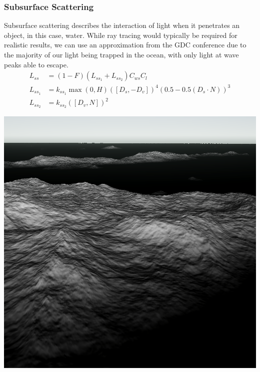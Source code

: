 \subsubsection{Subsurface Scattering}

Subsurface scattering describes the interaction of light when it penetrates an object, in this case, water. While ray tracing would typically be required for realistic results, we can use an approximation from the GDC conference \cite{mark2021} due to the majority of our light being trapped in the ocean, with only light at wave peaks able to escape. 
\begin{equation}
    \begin{split}
        L_{ss} &= (1-F) (L_{ss_1} + L_{ss_2}) C_{ws} C_l\\
        L_{ss_1} &= k_{ss_1} \max(0, H) ([D_s, -D_v])^{4}(0.5-0.5(D_s \cdot N))^{3}\\
        L_{ss_2} &= k_{ss_2} ([D_{v}, N])^{2}
    \end{split}
\end{equation}
\begin{minipage}[t]{0.32\textwidth}
    \includegraphics[width=1\textwidth]{"images/ss1_light.png"}
    \label{fig:lss1_light}
\end{minipage}
\hfill
